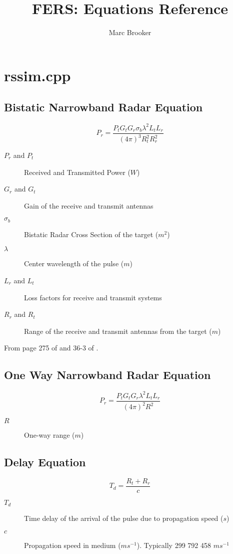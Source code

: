 \documentclass[a4paper,10pt]{article}
\title{FERS: Equations Reference}
\author{Marc Brooker}
\begin{document}
\maketitle

\section{rssim.cpp}
\subsection{Bistatic Narrowband Radar Equation}
\begin{equation}
P_r=\frac{P_t G_t G_r \sigma_b \lambda^2 L_t L_r}{(4 \pi)^3 R_t^2 R_r^2}
\end{equation}
\begin{description}
\item[$P_r$ and $P_t$] Received and Transmitted Power ($W$)
\item[$G_r$ and $G_t$] Gain of the receive and transmit antennas
\item[$\sigma_b$] Bistatic Radar Cross Section of the target ($m^2$)
\item[$\lambda$] Center wavelength of the pulse ($m$)
\item[$L_r$ and $L_t$] Loss factors for receive and transmit systems
\item[$R_r$ and $R_t$] Range of the receive and transmit antennas from the target ($m$)
 \end{description}
From page 275 of \cite{kings} and 36-3 of \cite{skolnik70}.


\subsection{One Way Narrowband Radar Equation}
\begin{equation}
P_r=\frac{P_t G_t G_r \lambda^2 L_t L_r}{(4 \pi)^2 R^2}
\end{equation}
\begin{description}
\item[$R$] One-way range ($m$)
\end{description}


\subsection{Delay Equation}
\begin{equation}
T_d = \frac{R_t + R_r}{c}
\end{equation}
\begin{description}
\item[$T_d$] Time delay of the arrival of the pulse due to propagation speed ($s$)
\item[$c$] Propagation speed in medium ($ms^{-1}$). Typically 299 792 458 $ms^{-1}$
\end{description}
\end{document}
